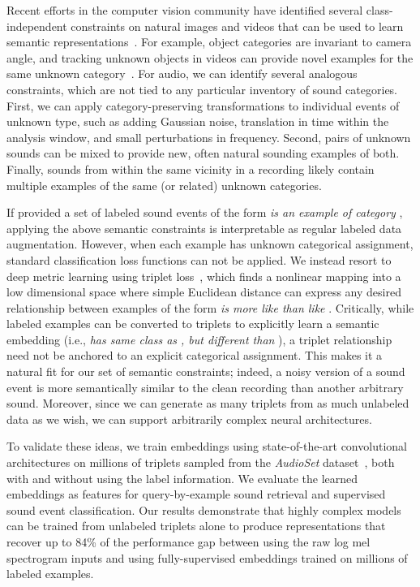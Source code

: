 \documentclass{article}
\begin{document}
Recent efforts in the computer vision community have identified several
class-independent constraints on natural images and videos that can be used to
learn semantic representations~\cite{zhang2016colorful}.  For example, object
categories are invariant to camera angle, and tracking unknown objects in videos
can provide novel examples for the same unknown
category~\cite{wang2015unsupervised}.  For audio, we can identify several
analogous constraints, which are not tied to any particular inventory of sound
categories.  First, we can apply category-preserving transformations to
individual events of unknown type, such as adding Gaussian noise, translation in
time within the analysis window, and small perturbations in frequency.  Second,
pairs of unknown sounds can be mixed to provide new, often natural sounding
examples of both.  Finally, sounds from within the same vicinity in a recording
likely contain multiple examples of the same (or related) unknown categories.

If provided a set of labeled sound events of the form \emph{ is an example of
  category }, applying the above semantic constraints is interpretable as
regular labeled data augmentation.  However, when each example has unknown
categorical assignment, standard classification loss functions can not be
applied.  We instead resort to deep metric learning using triplet
loss~\cite{weinberger2009distance,wang2014learning,hoffer2015deep}, which finds
a nonlinear mapping into a low dimensional space where simple Euclidean distance
can express any desired relationship between examples of the form \emph{ is
  more like  than like }.  Critically, while labeled examples can be
converted to triplets to explicitly learn a semantic embedding (i.e., \emph{
  has same class as , but different than }), a triplet relationship need
not be anchored to an explicit categorical assignment.  This makes it a natural
fit for our set of semantic constraints; indeed, a noisy version of a sound
event is more semantically similar to the clean recording than another arbitrary
sound.  Moreover, since we can generate as many triplets from as much unlabeled
data as we wish, we can support arbitrarily complex neural architectures.

To validate these ideas, we train embeddings using state-of-the-art
convolutional architectures on millions of triplets sampled from the
\emph{AudioSet} dataset~\cite{audioset}, both with and without using the label
information.  We evaluate the learned embeddings as features for
query-by-example sound retrieval and supervised sound event classification.  Our
results demonstrate that highly complex models can be trained from unlabeled
triplets alone to produce representations that recover up to 84\% of the
performance gap between using the raw log mel spectrogram inputs and using
fully-supervised embeddings trained on millions of labeled examples.
\end{document}
